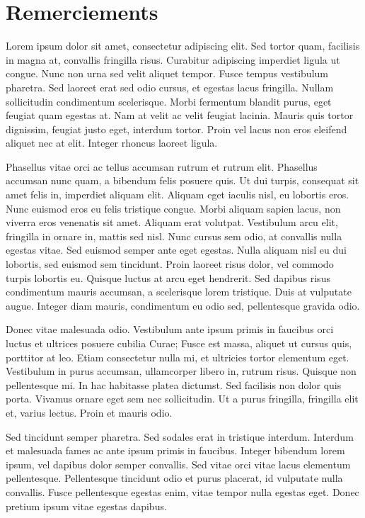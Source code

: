 \chapter*{Remerciements}

Lorem ipsum dolor sit amet, consectetur adipiscing elit. Sed tortor quam, facilisis in magna at, convallis fringilla risus. Curabitur adipiscing imperdiet ligula ut congue. Nunc non urna sed velit aliquet tempor. Fusce tempus vestibulum pharetra. Sed laoreet erat sed odio cursus, et egestas lacus fringilla. Nullam sollicitudin condimentum scelerisque. Morbi fermentum blandit purus, eget feugiat quam egestas at. Nam at velit ac velit feugiat lacinia. Mauris quis tortor dignissim, feugiat justo eget, interdum tortor. Proin vel lacus non eros eleifend aliquet nec at elit. Integer rhoncus laoreet ligula.

Phasellus vitae orci ac tellus accumsan rutrum et rutrum elit. Phasellus accumsan nunc quam, a bibendum felis posuere quis. Ut dui turpis, consequat sit amet felis in, imperdiet aliquam elit. Aliquam eget iaculis nisl, eu lobortis eros. Nunc euismod eros eu felis tristique congue. Morbi aliquam sapien lacus, non viverra eros venenatis sit amet. Aliquam erat volutpat. Vestibulum arcu elit, fringilla in ornare in, mattis sed nisl. Nunc cursus sem odio, at convallis nulla egestas vitae. Sed euismod semper ante eget egestas. Nulla aliquam nisl eu dui lobortis, sed euismod sem tincidunt. Proin laoreet risus dolor, vel commodo turpis lobortis eu. Quisque luctus at arcu eget hendrerit. Sed dapibus risus condimentum mauris accumsan, a scelerisque lorem tristique. Duis at vulputate augue. Integer diam mauris, condimentum eu odio sed, pellentesque gravida odio.

Donec vitae malesuada odio. Vestibulum ante ipsum primis in faucibus orci luctus et ultrices posuere cubilia Curae; Fusce est massa, aliquet ut cursus quis, porttitor at leo. Etiam consectetur nulla mi, et ultricies tortor elementum eget. Vestibulum in purus accumsan, ullamcorper libero in, rutrum risus. Quisque non pellentesque mi. In hac habitasse platea dictumst. Sed facilisis non dolor quis porta. Vivamus ornare eget sem nec sollicitudin. Ut a purus fringilla, fringilla elit et, varius lectus. Proin et mauris odio.

Sed tincidunt semper pharetra. Sed sodales erat in tristique interdum. Interdum et malesuada fames ac ante ipsum primis in faucibus. Integer bibendum lorem ipsum, vel dapibus dolor semper convallis. Sed vitae orci vitae lacus elementum pellentesque. Pellentesque tincidunt odio et purus placerat, id vulputate nulla convallis. Fusce pellentesque egestas enim, vitae tempor nulla egestas eget. Donec pretium ipsum vitae egestas dapibus.
